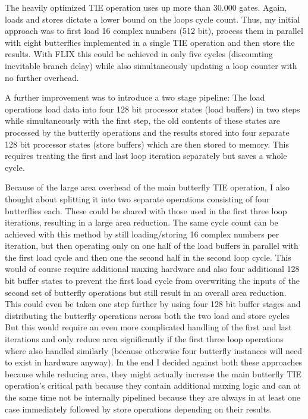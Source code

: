 \documentclass[ngerman, cd=lightcolor]{tudscrreprt}
\begin{document}
The heavily optimized TIE operation uses up more than 30.000 gates.  Again,
loads and stores dictate a lower bound on the loops cycle count. Thus, my
initial approach was to first load 16 complex numbers (512 bit), process them
in parallel with eight butterflies implemented in a single TIE operation and
then store the results. With FLIX this could be achieved in only five cycles
(discounting inevitable branch delay) while also simultaneously updating a loop
counter with no further overhead.

A further improvement was to introduce a two stage pipeline: The load
operations load data into four 128 bit processor states (load buffers) in two
steps while simultaneously with the first step, the old contents of these
states are processed by the butterfly operations and the results stored into
four separate 128 bit processor states (store buffers) which are then stored to
memory. This requires treating the first and last loop iteration separately but
saves a whole cycle.

Because of the large area overhead of the main butterfly TIE operation, I also
thought about splitting it into two separate operations consisting of four
butterflies each. These could be shared with those used in the first three loop
iterations, resulting in a large area reduction. The same cycle count can be
achieved with this method by still loading/storing 16 complex numbers per
iteration, but then operating only on one half of the load buffers in parallel
with the first load cycle and then one the second half in the second loop
cycle. This would of course require additional muxing hardware and also four
additional 128 bit buffer states to prevent the first load cycle from
overwriting the inputs of the second set of butterfly operations but still
result in an overall area reduction. This could even be taken one step further
by using four 128 bit buffer stages and distributing the butterfly operations
across both the two load and store cycles But this would require an even more
complicated handling of the first and last iterations and only reduce area
significantly if the first three loop operations where also handled similarly
(because otherwise four butterfly instances will need to exist in hardware
anyway).  In the end I decided against both these approaches because while
reducing area, they might actually increase the main butterfly TIE operation’s
critical path because they contain additional muxing logic and can at the same
time not be internally pipelined because they are always in at least one case
immediately followed by store operations depending on their results.
\end{document}
